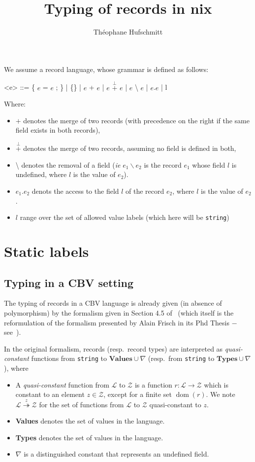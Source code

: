 \documentclass{article}
\title{Typing of records in nix}
\author{Théophane Hufschmitt}
\date{}
\newcommand{\meta}[1]{\ensuremath{#1}}
\renewcommand{\|}{\textrm{|}}
\def\e/{\meta{e}}
\newcommand{\ty}[1]{\texttt{#1}}
\newcommand{\set}[1]{\ensuremath{\mathcal{#1}}}
\newcommand{\undef}{\nabla}
\newcommand{\quasiconst}[1]{\overset{#1}{\twoheadrightarrow}}
\DeclareMathOperator\dom{dom}
\newcommand{\orthplus}{\overset{\bot}{+}}
\newcommand{\Γ}{\Gamma}
\newcommand{\τ}{\tau}
\newcommand{\σ}{\sigma}
\begin{document}
\maketitle{}

We assume a record language, whose grammar is defined as follows:

\begin{grammar}
  <e> ::= \{ \e/ = \e/ ; \} \| \{\}
    \| \e/ + \e/
    \| \e/ $\orthplus{}$ \e/
    \| \e/ \textbackslash{} \e/
    \| \e/.\e/
    \| l
\end{grammar}

Where:
\begin{itemize}
  \item $+$ denotes the merge of two records (with precedence on the right if
    the same field exists in both records),
  \item $\orthplus{}$ denotes the merge of two records, assuming no field is
    defined in both,
  \item \textbackslash{} denotes the removal of a field (\emph{ie} $e_1
    \backslash e_2$ is the record $e_1$ whose field $l$ is undefined, where $l$
    is the value of $e_2$).
  \item $e_1 . e_2$ denots the access to the field $l$ of the record $e_2$,
    where $l$ is the value of $e_2$.
  \item $l$ range over the set of allowed value labels (which here will be \ty{string})
\end{itemize}

\section{Static labels}
\subsection{Typing in a CBV setting}
The typing of records in a CBV language is already given (in absence of
polymorphism) by the formalism given in Section 4.5 of~\cite{Cas15} (which itself
is the reformulation of the formalism presented by Alain Frisch in its Phd
Thesis − see~\cite{Fri04}).

In the original formalism, records (resp.\ record types) are interpreted as
\emph{quasi-constant} functions from \ty{string} to $\textbf{Values} \cup
\undef$ (resp.\ from \ty{string} to $\textbf{Types} \cup \undef$), where
\begin{itemize}
  \item A \emph{quasi-constant} function from \set{L} to \set{Z} is a
    function $r: \set{L} \rightarrow \set{Z}$ which is constant to an element
    $z \in \set{Z}$, except for a finite set $\dom(r)$. We note $\set{L}
    \quasiconst{z} \set{Z}$ for the set of functions from \set{L} to \set{Z}
    quasi-constant to $z$.
  \item \textbf{Values} denotes the set of values in the language.
  \item \textbf{Types} denotes the set of values in the language.
  \item $\undef$ is a distinguished constant that represents an undefined
    field.
\end{itemize}
\end{document}
